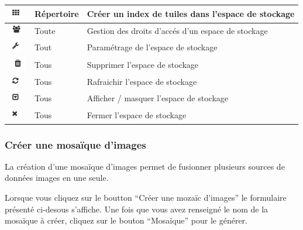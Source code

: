 \documentclass[letterpaper,10pt,french]{sphinxmanual}
\begin{document}
\begin{tabulary}{\linewidth}{|L|L|L|}
\\
\hline
\includegraphics{tile.png}
 & 
Répertoire
 & 
Créer un index de tuiles dans l'espace de stockage
\\
\hline
\includegraphics{privileges.png}
 & 
Toute
 & 
Gestion des droits d'accés d'un espace de stockage
\\
\hline
\includegraphics{configuration.png}
 & 
Tout
 & 
Paramétrage de l'espace de stockage
\\
\hline
\includegraphics{delete.png}
 & 
Tous
 & 
Supprimer l'espace de stockage
\\
\hline
\includegraphics{refresh.png}
 & 
Tous
 & 
Rafraichir l'espace de stockage
\\
\hline
\includegraphics{toggle1.png}
 & 
Tous
 & 
Afficher / masquer l'espace de stockage
\\
\hline
\includegraphics{close.png}
 & 
Tous
 & 
Fermer l'espace de stockage
\\
\hline\end{tabulary}



\subsubsection{Créer une mosaïque d'images}
\label{data/datastores:creer-une-mosaique-d-images}
La création d'une mosaïque d'images permet
de fusionner plusieurs sources de données images en une seule.

Lorsque vous cliquez sur le boutton ``Créer une mozaïc d'images'' le
formulaire présenté ci-desous s'affiche. Une fois que vous avez
renseigné le nom de la mosaïque à créer, cliquez sur le bouton
``Mosaïque'' pour le générer.
\end{document}
